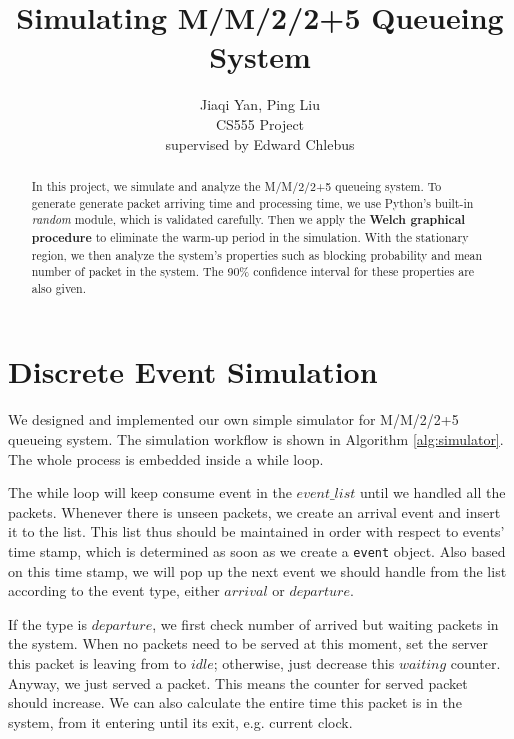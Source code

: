\documentclass[12pt]{article}  %
\title{Simulating M/M/2/2+5 Queueing System}
\author{Jiaqi Yan, Ping Liu\\
CS555 Project\\
supervised by
Edward Chlebus}
\theoremstyle{definition}
\theoremstyle{remark}
\begin{document}
\maketitle

\begin{abstract}
In this project, we simulate and analyze the M/M/2/2+5 queueing system. 
To generate generate packet arriving time and processing time, we use Python's built-in \textit{random} module, which is validated carefully.
Then we apply the \textbf{Welch graphical procedure} to eliminate the warm-up period in the simulation.
With the stationary region, we then analyze the system's properties such as blocking probability and mean number of packet in the system.
The 90\% confidence interval for these properties are also given.
\end{abstract}

\newpage
\tableofcontents

\newpage
\section{Discrete Event Simulation}\label{sec:des}
We designed and implemented our own simple simulator for M/M/2/2+5 queueing system.
The simulation workflow is shown in Algorithm \ref{alg:simulator}.
The whole process is embedded inside a while loop.

The while loop will keep consume event in the $event\_list$ until we handled all the packets.
Whenever there is unseen packets, we create an arrival event and insert it to the list.
This list thus should be maintained in order with respect to events' time stamp, which is determined as soon as we create a \texttt{event} object.
Also based on this time stamp, we will pop up the next event we should handle from the list according to the event type, either $arrival$ or $departure$.

If the type is $departure$, we first check number of arrived but waiting packets in the system.
When no packets need to be served at this moment, set the server this packet is leaving from to $idle$;
otherwise, just decrease this $waiting$ counter.
Anyway, we just served a packet.
This means the counter for served packet should increase.
We can also calculate the entire time this packet is in the system, from it entering until its exit, e.g. current clock.
\end{document}

